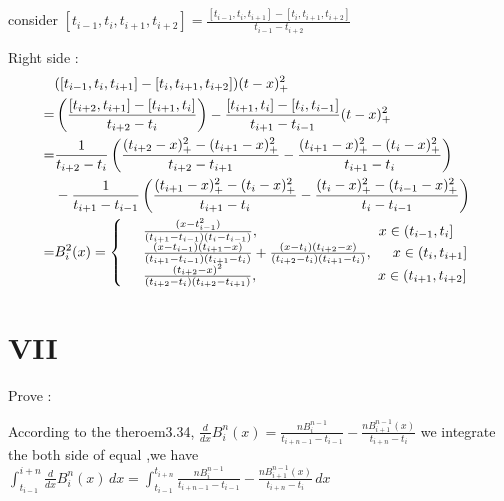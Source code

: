 \documentclass[a4paper]{article}
\begin{document}
consider $[t_{i-1}, t_{i}, t_{i+1}, t_{i+2}] = \frac{[t_{i-1}, t_{i}, t_{i+1}] - [t_{i}, t_{i+1}, t_{i+2}]}{t_{i-1} - t_{i+2}}$

Right side :
\begin{align}
    & ([t_{i-1}, t_{i}, t_{i+1}] - [t_{i}, t_{i+1}, t_{i+2}])(t-x)_{+}^{2} \\
    = & \left( \frac{[t_{i+2}, t_{i+1}] - [t_{i+1}, t_{i}]}{t_{i+2} - t_{i}} \right) 
    - \frac{[t_{i+1}, t_{i}] - [t_{i}, t_{i-1}]}{t_{i+1} - t_{i-1}}(t-x)_{+}^{2} \\
    = & \frac{1}{t_{i+2}-t_{i}} \left( \frac{(t_{i+2}-x)_{+}^{2} - (t_{i+1}-x)_{+}^{2}}{t_{i+2} - t_{i+1}} 
    - \frac{(t_{i+1}-x)_{+}^{2} - (t_{i}-x)_{+}^{2}}{t_{i+1} - t_{i}} \right) \\
    & - \frac{1}{t_{i+1}-t_{i-1}} \left( \frac{(t_{i+1}-x)_{+}^{2} - (t_{i}-x)_{+}^{2}}{t_{i+1}-t_{i}} 
    - \frac{(t_{i}-x)_{+}^{2} - (t_{i-1}-x)_{+}^{2}}{t_{i}-t_{i-1}} \right) \\
    = & B_{i}^{2}(x) =
    \left\{
    \begin{array}{rl}
        & \frac{(x-t_{i-1}^{2})}{(t_{i+1}-t_{i-1})(t_{i}-t_{i-1})} , \hspace{3cm} x \in (t_{i-1}, t_{i}] \\
        & \frac{(x - t_{i-1})(t_{i+1} - x)}{(t_{i+1}-t_{i-1})(t_{i+1}-t_{i})} 
        + \frac{(x - t_{i})(t_{i+2} - x)}{(t_{i+2}-t_{i})(t_{i+1}-t_{i})} , \hspace{0.5cm} x \in (t_{i}, t_{i+1}] \\
        & \frac{(t_{i+2} - x)^{2}}{(t_{i+2}-t_{i})(t_{i+2}-t_{i+1})} , \hspace{3cm} x \in (t_{i+1}, t_{i+2}] \\
    \end{array}
    \right.  %
\end{align}



\section*{VII}
Prove :

According to the theroem3.34, $\frac{d}{dx}B_{i}^{n}(x) = \frac{nB_{i}^{n-1}}{t_{i+n-1} - t_{i-1}} - \frac{nB_{i+1}^{n-1}(x)}{t_{i+n}-t_{i}}$
we integrate the both side of equal ,we have 
$\int_{t_{i-1}}^{i+n} \frac{d}{dx}B_{i}^{n}(x) \,dx = \int_{t_{i-1}}^{t_{i+n}} \frac{nB_{i}^{n-1}}{t_{i+n-1} - t_{i-1}} - \frac{nB_{i+1}^{n-1}(x)}{t_{i+n}-t_{i}} \,dx $
\end{document}
